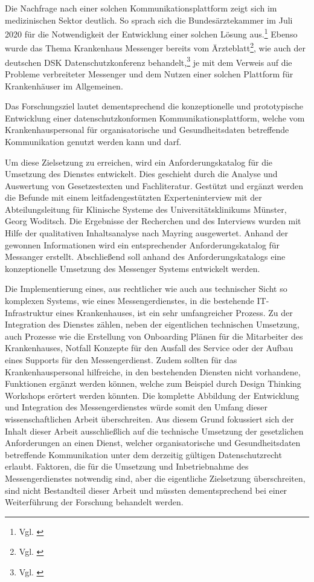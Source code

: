 Die Nachfrage nach einer solchen Kommunikationsplattform zeigt sich im medizinischen Sektor deutlich. So sprach sich die Bundesärztekammer im Juli 2020 für die Notwendigkeit der Entwicklung einer solchen Lösung aus.\footnote{Vgl. \cite{Bundesaerztekammer2019}} Ebenso wurde das Thema Krankenhaus Messenger bereits vom Ärzteblatt\footnote{Vgl. \cite{Giesselmann2018}}, wie auch der deutschen DSK Datenschutzkonferenz behandelt,\footnote{Vgl. \cite{Datenschutzkonferenz2019}} je mit dem Verweis auf die Probleme verbreiteter Messenger und dem Nutzen einer solchen Plattform für Krankenhäuser im Allgemeinen.

Das Forschungsziel lautet dementsprechend die konzeptionelle und prototypische Entwicklung einer datenschutzkonformen Kommunikationsplattform, welche vom Krankenhauspersonal für organisatorische und Gesundheitsdaten betreffende Kommunikation genutzt werden kann und darf. 

Um diese Zielsetzung zu erreichen, wird ein Anforderungskatalog für die Umsetzung des Dienstes entwickelt. Dies geschieht durch die Analyse und Auswertung von Gesetzestexten und Fachliteratur. Gestützt und ergänzt werden die Befunde mit einem leitfadengestützten Experteninterview mit der Abteilungsleitung für Klinische Systeme des Universitätsklinikums Münster, Georg Woditsch. Die Ergebnisse der Recherchen und des Interviews wurden mit Hilfe der qualitativen Inhaltsanalyse nach Mayring ausgewertet. Anhand der gewonnen Informationen wird ein entsprechender Anforderungskatalog für Messanger erstellt. Abschließend soll anhand des Anforderungskatalogs eine konzeptionelle Umsetzung des Messenger Systems entwickelt werden.

Die Implementierung eines, aus rechtlicher wie auch aus technischer Sicht so komplexen Systems, wie eines Messengerdienstes, in die bestehende IT-Infrastruktur eines Krankenhauses, ist ein sehr umfangreicher Prozess. Zu der Integration des Dienstes zählen, neben der eigentlichen technischen Umsetzung, auch Prozesse wie die Erstellung von Onboarding Plänen für die Mitarbeiter des Krankenhauses, Notfall Konzepte für den Ausfall des Service oder der Aufbau eines Supports für den Messengerdienst. Zudem sollten für das Krankenhauspersonal hilfreiche, in den bestehenden Diensten nicht vorhandene, Funktionen ergänzt werden können, welche zum Beispiel durch Design Thinking Workshops erörtert werden könnten. Die komplette Abbildung der Entwicklung und Integration des Messengerdienstes würde somit den Umfang dieser wissenschaftlichen Arbeit überschreiten. Aus diesem Grund fokussiert sich der Inhalt dieser Arbeit ausschließlich auf die technische Umsetzung der gesetzlichen Anforderungen an einen Dienst, welcher organisatorische und Gesundheitsdaten betreffende Kommunikation unter dem derzeitig gültigen Datenschutzrecht erlaubt. Faktoren, die für die Umsetzung und Inbetriebnahme des Messengerdienstes notwendig sind, aber die eigentliche Zielsetzung überschreiten, sind nicht Bestandteil dieser Arbeit und müssten dementsprechend bei einer Weiterführung der Forschung behandelt werden.
